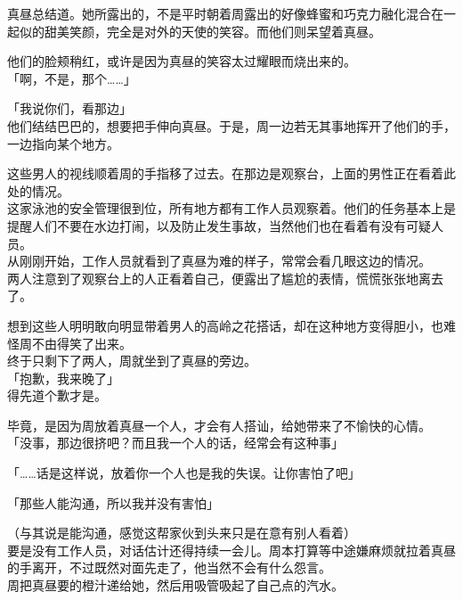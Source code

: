 真昼总结道。她所露出的，不是平时朝着周露出的好像蜂蜜和巧克力融化混合在一起似的甜美笑颜，完全是对外的天使的笑容。而他们则呆望着真昼。

他们的脸颊稍红，或许是因为真昼的笑容太过耀眼而烧出来的。\\

「啊，不是，那个……」

「我说你们，看那边」\\

他们结结巴巴的，想要把手伸向真昼。于是，周一边若无其事地挥开了他们的手，一边指向某个地方。

这些男人的视线顺着周的手指移了过去。在那边是观察台，上面的男性正在看着此处的情况。\\

这家泳池的安全管理很到位，所有地方都有工作人员观察着。他们的任务基本上是提醒人们不要在水边打闹，以及防止发生事故，当然他们也在看着有没有可疑人员。\\

从刚刚开始，工作人员就看到了真昼为难的样子，常常会看几眼这边的情况。\\

两人注意到了观察台上的人正看着自己，便露出了尴尬的表情，慌慌张张地离去了。

想到这些人明明敢向明显带着男人的高岭之花搭话，却在这种地方变得胆小，也难怪周不由得笑了出来。\\

终于只剩下了两人，周就坐到了真昼的旁边。\\

「抱歉，我来晚了」\\

得先道个歉才是。

毕竟，是因为周放着真昼一个人，才会有人搭讪，给她带来了不愉快的心情。\\

「没事，那边很挤吧？而且我一个人的话，经常会有这种事」

「……话是这样说，放着你一个人也是我的失误。让你害怕了吧」

「那些人能沟通，所以我并没有害怕」

（与其说是能沟通，感觉这帮家伙到头来只是在意有别人看着）\\

要是没有工作人员，对话估计还得持续一会儿。周本打算等中途嫌麻烦就拉着真昼的手离开，不过既然对面先走了，他当然不会有什么怨言。\\

周把真昼要的橙汁递给她，然后用吸管吸起了自己点的汽水。\\

